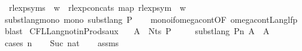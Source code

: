 \begin{isabellebody}
\ \ {\isachardoublequoteopen}rlexp{\isacharunderscore}{\kern0pt}syms\ {\isasymgamma}{\isacharprime}{\kern0pt}\ w\ {\isacharequal}{\kern0pt}\ rlexp{\isacharunderscore}{\kern0pt}concats\ {\isacharparenleft}{\kern0pt}map\ {\isacharparenleft}{\kern0pt}rlexp{\isacharunderscore}{\kern0pt}sym\ {\isasymgamma}{\isacharprime}{\kern0pt}{\isacharparenright}{\kern0pt}\ w{\isacharparenright}{\kern0pt}{\isachardoublequoteclose}\isanewline
\isanewline
\isanewline
\isanewline
\isanewline
{}\isamarkupfalse%
\ subst{\isacharunderscore}{\kern0pt}lang{\isacharunderscore}{\kern0pt}mono{\isacharcolon}{\kern0pt}\ {\isachardoublequoteopen}mono\ {\isacharparenleft}{\kern0pt}subst{\isacharunderscore}{\kern0pt}lang\ P{\isacharparenright}{\kern0pt}{\isachardoublequoteclose}\isanewline
%
\isadelimproof
\ \ %
\endisadelimproof
%
\isatagproof
{}\isamarkupfalse%
\ mono{\isacharunderscore}{\kern0pt}if{\isacharunderscore}{\kern0pt}omega{\isacharunderscore}{\kern0pt}cont{\isacharbrackleft}{\kern0pt}OF\ omega{\isacharunderscore}{\kern0pt}cont{\isacharunderscore}{\kern0pt}Lang{\isacharunderscore}{\kern0pt}lfp{\isacharbrackright}{\kern0pt}\ \isamarkupfalse%
\ blast%
\endisatagproof
{\isafoldproof}%
%
\isadelimproof
\isanewline
%
\endisadelimproof
\isanewline
{}\isamarkupfalse%
\ CFL{\isacharunderscore}{\kern0pt}Lang{\isacharunderscore}{\kern0pt}not{\isacharunderscore}{\kern0pt}in{\isacharunderscore}{\kern0pt}Prods{\isacharunderscore}{\kern0pt}aux{\isacharcolon}{\kern0pt}\isanewline
\ \ \ {\isachardoublequoteopen}A\ {\isasymnotin}\ Nts\ P{\isachardoublequoteclose}\isanewline
\ \ \ \ \ {\isachardoublequoteopen}{\isacharparenleft}{\kern0pt}{\isacharparenleft}{\kern0pt}subst{\isacharunderscore}{\kern0pt}lang\ P{\isacharparenright}{\kern0pt}{\isacharcircum}{\kern0pt}{\isacharcircum}{\kern0pt}n{\isacharparenright}{\kern0pt}\ {\isacharparenleft}{\kern0pt}{\isasymlambda}A{\isachardot}{\kern0pt}\ {\isacharbraceleft}{\kern0pt}{\isacharbraceright}{\kern0pt}{\isacharparenright}{\kern0pt}\ A\ {\isacharequal}{\kern0pt}\ {\isacharbraceleft}{\kern0pt}{\isacharbraceright}{\kern0pt}{\isachardoublequoteclose}\isanewline
%
\isadelimproof
%
\endisadelimproof
%
\isatagproof
{}\isamarkupfalse%
\ {\isacharparenleft}{\kern0pt}cases\ n{\isacharparenright}{\kern0pt}\isanewline
\ \ \isamarkupfalse%
\ {\isacharparenleft}{\kern0pt}Suc\ nat{\isacharparenright}{\kern0pt}\isanewline
\ \ \isamarkupfalse%
\ assms\ \isamarkupfalse%

\end{isabellebody}
